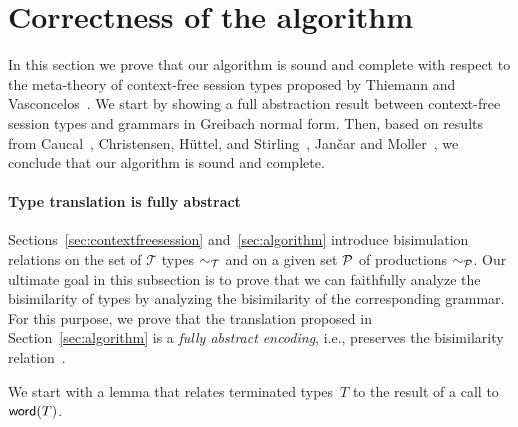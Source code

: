 \section{Correctness of the algorithm}
\label{sec:correctness}

In this section we prove that our algorithm is sound and complete
with respect to the meta-theory of context-free session types proposed
by Thiemann and Vasconcelos~\cite{thiemann2016context}.
%
We start by showing a full abstraction result between context-free
session types and grammars in Greibach normal form.
%
Then, based on results from Caucal~\cite{caucal1986decidabilite},
Christensen, H{\"{u}}ttel, and
Stirling~\cite{DBLP:journals/iandc/ChristensenHS95}, Jan{\v{c}}ar and
Moller~\cite{janvcar1999techniques}, we conclude that our algorithm is
sound and complete.

\paragraph{Type translation is fully abstract}

Sections~\ref{sec:contextfreesession} and~\ref{sec:algorithm}
introduce bisimulation relations on the set of $\mathcal T$ types
$\sim_\mathcal T$ and on a given set $\mathcal P$ of productions
$\sim_\mathcal P$.  Our ultimate goal in this subsection is to prove that
we can faithfully analyze the bisimilarity of types by analyzing the
bisimilarity of the corresponding grammar. For this purpose, we prove
that the translation proposed in Section~\ref{sec:algorithm} is a
\emph{fully abstract encoding}, i.e., preserves the bisimilarity
relation~\cite{gorla2016full}.


We start with a lemma that relates terminated types~$T$ to the result 
of a call to $\mathsf{word}(T)$.

